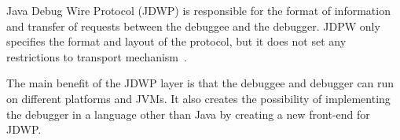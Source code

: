 \documentclass[..thesis.tex]{subfiles}
\begin{document}
Java Debug Wire Protocol (JDWP) is responsible for the format of information and transfer of requests between the debuggee and the debugger.
JDPW only specifies the format and layout of the protocol, but it does not set any restrictions to transport mechanism~\cite{oracle_jpda_jdwp}.

The main benefit of the JDWP layer is that the debuggee and debugger can run on different platforms and JVMs.
It also creates the possibility of implementing the debugger in a language other than Java by creating a new front-end for JDWP.
\end{document}
